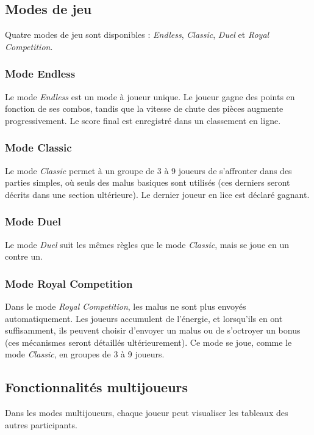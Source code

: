 \documentclass{report}
\begin{document}
\subsection{Modes de jeu}
\noindent Quatre modes de jeu sont disponibles : \emph{Endless}, \emph{Classic}, \emph{Duel} et \emph{Royal Competition}.

\subsubsection{Mode Endless}
\noindent Le mode \emph{Endless} est un mode à joueur unique. Le joueur gagne des points en fonction de ses combos, tandis que la vitesse de chute des pièces augmente progressivement. Le score final est enregistré dans un classement en ligne.

\subsubsection{Mode Classic}
\noindent Le mode \emph{Classic} permet à un groupe de 3 à 9 joueurs de s’affronter dans des parties simples, où seuls des malus basiques sont utilisés (ces derniers seront décrits dans une section ultérieure). Le dernier joueur en lice est déclaré gagnant.

\subsubsection{Mode Duel}
\noindent Le mode \emph{Duel} suit les mêmes règles que le mode \emph{Classic}, mais se joue en un contre un.

\subsubsection{Mode Royal Competition}
\noindent Dans le mode \emph{Royal Competition}, les malus ne sont plus envoyés automatiquement. Les joueurs accumulent de l'énergie, et lorsqu’ils en ont suffisamment, ils peuvent choisir d'envoyer un malus ou de s’octroyer un bonus (ces mécanismes seront détaillés ultérieurement). Ce mode se joue, comme le mode \emph{Classic}, en groupes de 3 à 9 joueurs.

\subsection{Fonctionnalités multijoueurs}
\noindent Dans les modes multijoueurs, chaque joueur peut visualiser les tableaux des autres participants.
\end{document}
